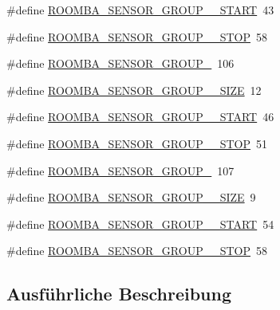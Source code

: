 \begin{DoxyCompactItemize}
\item 
\#define \hyperlink{group__roomba__sensor__group_ga7828ffaa8bf348be22cf2d044c36fbe4}{R\-O\-O\-M\-B\-A\-\_\-\-S\-E\-N\-S\-O\-R\-\_\-\-G\-R\-O\-U\-P\-\_\-\_\-\-S\-T\-A\-R\-T}~43
\item 
\#define \hyperlink{group__roomba__sensor__group_ga408b89d656a6b650bc0f742dc195e53e}{R\-O\-O\-M\-B\-A\-\_\-\-S\-E\-N\-S\-O\-R\-\_\-\-G\-R\-O\-U\-P\-\_\-\_\-\-S\-T\-O\-P}~58
\item 
\#define \hyperlink{group__roomba__sensor__group_ga2fb3c06950071ca647d51f875c03144c}{R\-O\-O\-M\-B\-A\-\_\-\-S\-E\-N\-S\-O\-R\-\_\-\-G\-R\-O\-U\-P\-\_}~106
\item 
\#define \hyperlink{group__roomba__sensor__group_gafa200ace1c478ae042b3a7bdf0ca3f7e}{R\-O\-O\-M\-B\-A\-\_\-\-S\-E\-N\-S\-O\-R\-\_\-\-G\-R\-O\-U\-P\-\_\-\_\-\-S\-I\-Z\-E}~12
\item 
\#define \hyperlink{group__roomba__sensor__group_gabd95e3fa549a13bf2476ab3a6400b7c4}{R\-O\-O\-M\-B\-A\-\_\-\-S\-E\-N\-S\-O\-R\-\_\-\-G\-R\-O\-U\-P\-\_\-\_\-\-S\-T\-A\-R\-T}~46
\item 
\#define \hyperlink{group__roomba__sensor__group_gae1d47c305d9338da5ae5f1b5fe90e988}{R\-O\-O\-M\-B\-A\-\_\-\-S\-E\-N\-S\-O\-R\-\_\-\-G\-R\-O\-U\-P\-\_\-\_\-\-S\-T\-O\-P}~51
\item 
\#define \hyperlink{group__roomba__sensor__group_ga7c4ea4d5c016ce39f8c88af39c4d87f8}{R\-O\-O\-M\-B\-A\-\_\-\-S\-E\-N\-S\-O\-R\-\_\-\-G\-R\-O\-U\-P\-\_}~107
\item 
\#define \hyperlink{group__roomba__sensor__group_ga68caeb0c956abb46fe19b1f7b6ec502b}{R\-O\-O\-M\-B\-A\-\_\-\-S\-E\-N\-S\-O\-R\-\_\-\-G\-R\-O\-U\-P\-\_\-\_\-\-S\-I\-Z\-E}~9
\item 
\#define \hyperlink{group__roomba__sensor__group_gac996d409d291828dc82c695853592e18}{R\-O\-O\-M\-B\-A\-\_\-\-S\-E\-N\-S\-O\-R\-\_\-\-G\-R\-O\-U\-P\-\_\-\_\-\-S\-T\-A\-R\-T}~54
\item 
\#define \hyperlink{group__roomba__sensor__group_ga52c81df81177bca0049e27c482e6593a}{R\-O\-O\-M\-B\-A\-\_\-\-S\-E\-N\-S\-O\-R\-\_\-\-G\-R\-O\-U\-P\-\_\-\_\-\-S\-T\-O\-P}~58
\end{DoxyCompactItemize}


\subsection{Ausführliche Beschreibung}


